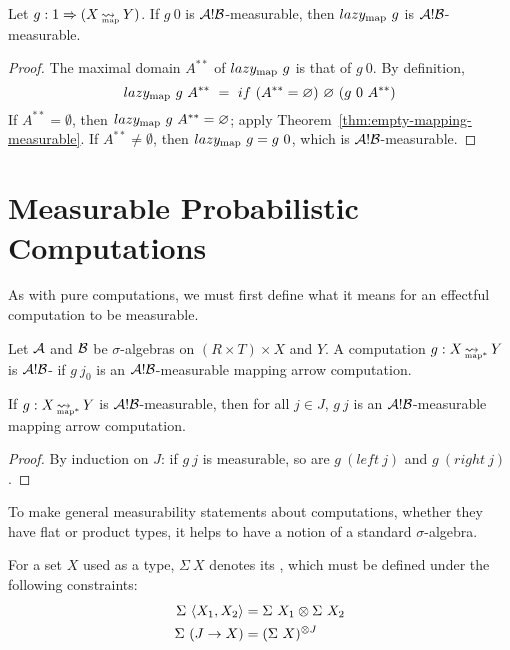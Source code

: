 \begin{theorem}
Let $g : 1 \Rightarrow (X \operatorname{\rightsquigarrow_{\mspace{-21mu}_\mathrm{map}}} Y)$. If $g~0$ is $\mathcal{A}!\mathcal{B}$-measurable, then $lazy_\mathrm{map}~g$ is $\mathcal{A}!\mathcal{B}$-measurable.
\end{theorem}
\begin{proof}
The maximal domain $A^{**}$ of $lazy_\mathrm{map}~g$ is that of $g~0$.
By definition,
\begin{equation}
	lazy_\mathrm{map}~g~A^{**} \ = \ if~(A^{**} = \varnothing)~\varnothing~(g~0~A^{**})
\end{equation}
If $A^{**} = \emptyset$, then $lazy_\mathrm{map}~g~A^{**} = \varnothing$; apply Theorem~\ref{thm:empty-mapping-measurable}.
If $A^{**} \neq \emptyset$, then $lazy_\mathrm{map}~g = g~0$, which is $\mathcal{A}!\mathcal{B}$-measurable.
\end{proof}

\section{Measurable Probabilistic Computations}

As with pure computations, we must first define what it means for an effectful computation to be measurable.

\begin{definition}
Let $\mathcal{A}$ and $\mathcal{B}$ be $\sigma$-algebras on $(R \times T) \times X$ and $Y$.
A computation $g : X \operatorname{\rightsquigarrow_{\mspace{-22mu}_{\mathrm{map*}}}} Y$ is $\mathcal{A}!\mathcal{B}$- if $g~j_0$ is an $\mathcal{A}!\mathcal{B}$-measurable mapping arrow computation.
\end{definition}

\begin{theorem}
If $g : X \operatorname{\rightsquigarrow_{\mspace{-22mu}_{\mathrm{map*}}}} Y$ is $\mathcal{A}!\mathcal{B}$-measurable, then for all $j \in J$, $g~j$ is an $\mathcal{A}!\mathcal{B}$-measurable mapping arrow computation.
\end{theorem}
\begin{proof}
By induction on $J$: if $g~j$ is measurable, so are $g~(left~j)$ and $g~(right~j)$.
\end{proof}

To make general measurability statements about computations, whether they have flat or product types, it helps to have a notion of a standard $\sigma$-algebra.

\begin{definition}
\label{def:standard-sigma-algebra}
For a set $X$ used as a type, $\Sigma~X$ denotes its , which must be defined under the following constraints:
\begin{align}
	\Sigma~\langle{X_1,X_2}\rangle & = \Sigma~X_1 \otimes \Sigma~X_2
	\label{eqn:standard-finite-product-rule}
\\
	\Sigma~(J \to X) & = (\Sigma~X)^{\otimes J}
	\label{eqn:standard-arbitrary-product-rule}
\end{align}
\end{definition}


